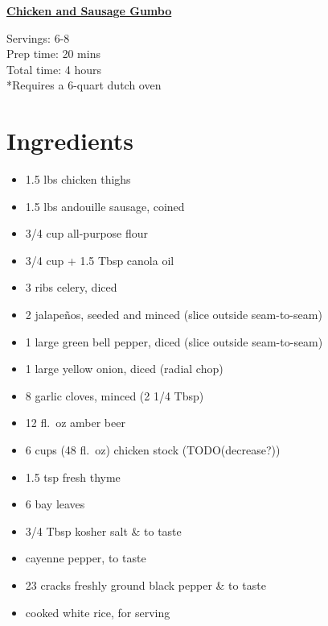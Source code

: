 \documentclass[11pt]{article}
\begin{document}
	\begin{center}\begin{huge}\underline{\textbf{Chicken and Sausage Gumbo}}\end{huge}\end{center}

	Servings: 6-8\\
	Prep time: 20 mins\\
	Total time: 4 hours\\

	*Requires a 6-quart dutch oven

	\section*{Ingredients}
	\begin{itemize}
		\item 1.5 lbs chicken thighs
		\item 1.5 lbs andouille sausage, coined
		\item 3/4 cup all-purpose flour
		\item 3/4 cup + 1.5 Tbsp canola oil
		\item 3 ribs celery, diced
		\item 2 jalape\~nos, seeded and minced (slice outside seam-to-seam)
		\item 1 large green bell pepper, diced (slice outside seam-to-seam)
		\item 1 large yellow onion, diced (radial chop)
		\item 8 garlic cloves, minced (2 1/4 Tbsp)
		\item 12 fl.~oz amber beer
		\item 6 cups (48 fl.~oz) chicken stock (TODO(decrease?))
		\item 1.5 tsp fresh thyme
		\item 6 bay leaves
		\item 3/4 Tbsp kosher salt \& to taste
		\item cayenne pepper, to taste
		\item 23 cracks freshly ground black pepper \& to taste
		\item cooked white rice, for serving
	\end{itemize}
\end{document}
